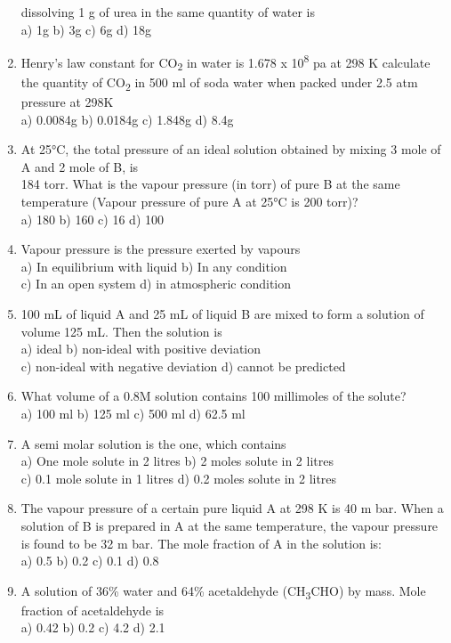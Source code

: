 \begin{enumerate}
  dissolving 1 g of urea in the same quantity of water is\\
  a) 1g b) 3g c) 6g d) 18g
\item
  Henry's law constant for CO\textsubscript{2} in water is 1.678 x
  10\textsuperscript{8} pa at 298 K calculate the quantity of
  CO\textsubscript{2} in 500 ml of soda water when packed under 2.5 atm
  pressure at 298K\\
  a) 0.0084g b) 0.0184g c) 1.848g d) 8.4g
\item
  At 25°C, the total pressure of an ideal solution obtained by mixing 3
  mole of A and 2 mole of B, is\\
  184 torr. What is the vapour pressure (in torr) of pure B at the same
  temperature (Vapour pressure of pure A at 25°C is 200 torr)?\\
  a) 180 b) 160 c) 16 d) 100
\item
  Vapour pressure is the pressure exerted by vapours\\
  a) In equilibrium with liquid b) In any condition\\
  c) In an open system d) in atmospheric condition
\item
  100 mL of liquid A and 25 mL of liquid B are mixed to form a solution
  of volume 125 mL. Then the solution is\\
  a) ideal b) non-ideal with positive deviation\\
  c) non-ideal with negative deviation d) cannot be predicted
\item
  What volume of a 0.8M solution contains 100 millimoles of the
  solute?\\
  a) 100 ml b) 125 ml c) 500 ml d) 62.5 ml
\item
  A semi molar solution is the one, which contains\\
  a) One mole solute in 2 litres b) 2 moles solute in 2 litres\\
  c) 0.1 mole solute in 1 litres d) 0.2 moles solute in 2 litres
\item
  The vapour pressure of a certain pure liquid A at 298 K is 40 m bar.
  When a solution of B is prepared in A at the same temperature, the
  vapour pressure is found to be 32 m bar. The mole fraction of A in the
  solution is:\\
  a) 0.5 b) 0.2 c) 0.1 d) 0.8
\item
  A solution of 36\% water and 64\% acetaldehyde
  (CH\textsubscript{3}CHO) by mass. Mole fraction of acetaldehyde is\\
  a) 0.42 b) 0.2 c) 4.2 d) 2.1

\end{enumerate}
